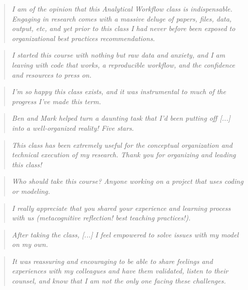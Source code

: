 \documentclass[10pt]{article}
\begin{document}
\begin{quote}
	\emph{I am of the opinion that this Analytical Workflow class is indispensable. Engaging in research 
	comes with a massive deluge of papers, files, data, output, etc, and yet prior to this class I had never 
	before been exposed to organizational best practices recommendations.}
\end{quote}
\begin{quote}
	\emph{I started this course with nothing but raw data and anxiety, and I am leaving with code that 
		works, a reproducible workflow, and the confidence and resources to press on.}
\end{quote}
\begin{quote}
	\emph{I'm so happy this class exists, and it was instrumental to much of the progress I've made this 
	term.}
\end{quote}
\begin{quote}
\emph{Ben and Mark helped turn a daunting task that I'd been putting off [...] into a 
well-organized reality! Five stars.}
\end{quote}
\begin{quote}
	\emph{This class has been extremely useful for the conceptual organization and technical execution 
	of my research. Thank you for organizing and leading this class!}
\end{quote}
\begin{quote}
	\emph{Who should take this course?  Anyone working on a project that uses coding or modeling.}
\end{quote}
\begin{quote}
	\emph{I really appreciate that you shared your experience and learning process with us (metacognitive 
		reflection! best teaching practices!).}
\end{quote}
\begin{quote}
	\emph{After taking the class, [...] I feel empowered to solve issues with my model on my own.}
\end{quote}
\begin{quote}
	\emph{It was reassuring and encouraging to be able to share feelings and experiences with my 
	colleagues and have them validated, listen to their counsel, and know that I am not the only one 
	facing these challenges.}
\end{quote}
\end{document}
